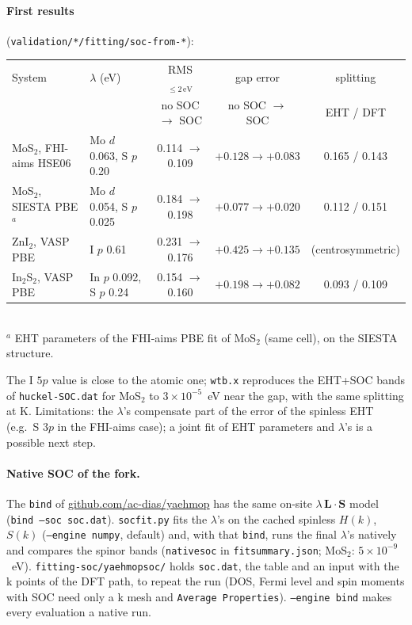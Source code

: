 \documentclass[11pt,a4paper]{article}
\newcommand{\cmd}[1]{\texttt{#1}}
\renewcommand{\_}{\origunderscore\allowbreak}
\begin{document}
\paragraph{First results} (\cmd{validation/*/fitting/soc-from-*}):
\begin{center}\small
\begin{tabularx}{\textwidth}{L L c c c}
\toprule
System & $\lambda$ (eV) & RMS$_{\le 2\,\mathrm{eV}}$ & gap error & splitting \\
 & & no SOC $\to$ SOC & no SOC $\to$ SOC & EHT / DFT \\
\midrule
MoS$_2$, FHI-aims HSE06 & Mo $d$ 0.063, S $p$ 0.20 & 0.114 $\to$ 0.109 & $+0.128\to+0.083$ & 0.165 / 0.143 \\
MoS$_2$, SIESTA PBE$^{a}$ & Mo $d$ 0.054, S $p$ 0.025 & 0.184 $\to$ 0.198 & $+0.077\to+0.020$ & 0.112 / 0.151 \\
ZnI$_2$, VASP PBE & I $p$ 0.61 & 0.231 $\to$ 0.176 & $+0.425\to+0.135$ & (centrosymmetric) \\
In$_2$S$_2$, VASP PBE & In $p$ 0.092, S $p$ 0.24 & 0.154 $\to$ 0.160 & $+0.198\to+0.082$ & 0.093 / 0.109 \\
\bottomrule
\end{tabularx}\\[2pt]
{\footnotesize $^{a}$ EHT parameters of the FHI-aims PBE fit of MoS$_2$ (same cell), on the SIESTA structure.}
\end{center}
The I $5p$ value is close to the atomic one; \cmd{wtb.x} reproduces the EHT+SOC bands of \cmd{huckel-SOC.dat} for MoS$_2$
to $3\times10^{-5}$~eV near the gap, with the same splitting at K. Limitations: the $\lambda$'s compensate part of the error
of the spinless EHT (e.g.\ S $3p$ in the FHI-aims case); a joint fit of EHT parameters and $\lambda$'s is a possible next step.

\paragraph{Native SOC of the fork.} The \cmd{bind} of \href{https://github.com/ac-dias/yaehmop}{github.com/ac-dias/yaehmop}
has the same on-site $\lambda\,\mathbf{L}\cdot\mathbf{S}$ model (\cmd{bind --soc soc.dat}). \cmd{soc\_fit.py} fits the $\lambda$'s on the
cached spinless $H(k)$, $S(k)$ (\cmd{--engine numpy}, default) and, with that \cmd{bind}, runs the final $\lambda$'s natively and
compares the spinor bands (\cmd{native\_soc} in \cmd{fit\_summary.json}; MoS$_2$: $5\times10^{-9}$~eV). \cmd{fitting-soc/yaehmop\_soc/}
holds \cmd{soc.dat}, the table and an input with the k points of the DFT path, to repeat the run (DOS, Fermi level and spin
moments with SOC need only a k mesh and \cmd{Average Properties}). \cmd{--engine bind} makes every evaluation a native run.
\end{document}
